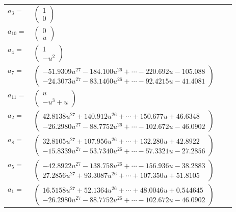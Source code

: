 \documentclass[1p]{elsarticle_modified}
\theoremstyle{definition}
\begin{document}
\begin{tabular}{m{7pt} m{180pt} m{7pt} m{180pt} }
\flushright $a_{3}=$&$\begin{pmatrix}1\\0\end{pmatrix}$ \\
\flushright $a_{10}=$&$\begin{pmatrix}0\\u\end{pmatrix}$ \\
\flushright $a_{4}=$&$\begin{pmatrix}1\\- u^2\end{pmatrix}$ \\
\flushright $a_{7}=$&$\begin{pmatrix}-51.9309 u^{27}-184.100 u^{26}+\cdots-220.692 u-105.088\\-24.3073 u^{27}-83.1460 u^{26}+\cdots-92.4215 u-41.4081\end{pmatrix}$ \\
\flushright $a_{11}=$&$\begin{pmatrix}u\\- u^3+u\end{pmatrix}$ \\
\flushright $a_{2}=$&$\begin{pmatrix}42.8138 u^{27}+140.912 u^{26}+\cdots+150.677 u+46.6348\\-26.2980 u^{27}-88.7752 u^{26}+\cdots-102.672 u-46.0902\end{pmatrix}$ \\
\flushright $a_{8}=$&$\begin{pmatrix}32.8105 u^{27}+107.956 u^{26}+\cdots+132.280 u+42.8922\\-15.8339 u^{27}-53.7340 u^{26}+\cdots-57.3321 u-27.2856\end{pmatrix}$ \\
\flushright $a_{5}=$&$\begin{pmatrix}-42.8922 u^{27}-138.758 u^{26}+\cdots-156.936 u-38.2883\\27.2856 u^{27}+93.3087 u^{26}+\cdots+107.350 u+51.8105\end{pmatrix}$ \\
\flushright $a_{1}=$&$\begin{pmatrix}16.5158 u^{27}+52.1364 u^{26}+\cdots+48.0046 u+0.544645\\-26.2980 u^{27}-88.7752 u^{26}+\cdots-102.672 u-46.0902\end{pmatrix}$ \\

\end{tabular}
\end{document}
